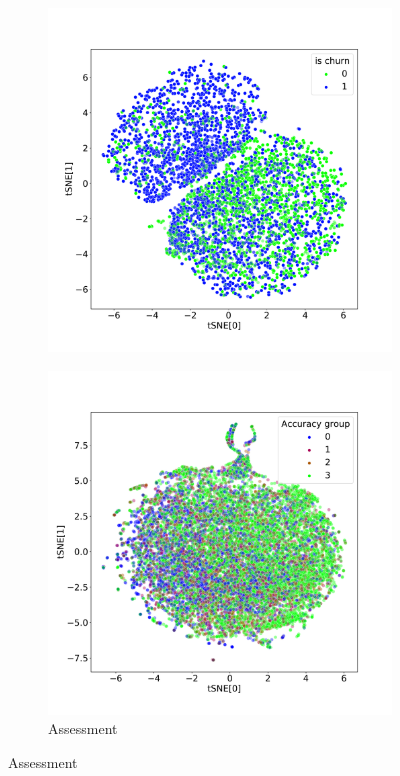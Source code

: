 \documentclass{article}
\begin{document}
\begin{figure}
\begin{subfigure}{0.5\textwidth}
    \includegraphics[width=\textwidth]{figures/iclr-churn-tsne.pdf}
    \label{fig-tsne-churn}
  \end{subfigure}
  \begin{subfigure}{0.5\textwidth}
    \caption{Assessment}
    \includegraphics[width=\textwidth]{figures/iclr-bowl-tsne-accuracy_group.pdf}

\end{subfigure}
\end{figure}
\end{document}
